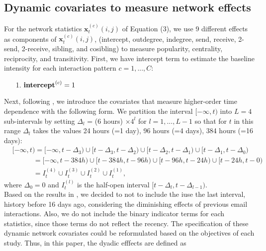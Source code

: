 \documentclass[a4paper]{article}
\begin{document}
 \subsection{Dynamic covariates to measure network effects} \label{subsec: Dynamic covariates2}
 For the network statistics $\boldsymbol{x}^{(c)}_t(i, j)$ of Equation (3), we use 9 different effects as components of $\boldsymbol{x}^{(c)}_t(i, j)$, (intercept, outdegree, indegree, send, receive, 2-send, 2-receive, sibling, and cosibling) to measure popularity, centrality, reciprocity, and transitivity. First, we have intercept term to estimate the baseline intensity for each interaction pattern $c=1,...,C$:
 \begin{itemize}
	\item [1.] $\mbox{\textbf{intercept}}^{(c)}= 1$
 \end{itemize}
Next, following \cite{PerryWolfe2012}, we introduce the covariates that measure higher-order time dependence with the following
form. We partition the interval $[-\infty, t)$ into $L=4$ sub-intervals by setting $\Delta_l$ = (6 hours) $\times  4^l$ for $l=1,...,L-1$ so that for $t$ in this range $\Delta_l$ takes the values 24 hours (=1 day), 96 hours (=4 days), 384 hours (=16 days): 
\begin{equation*}
\begin{aligned}
&[-\infty,t) =[-\infty,t-\Delta_3)\cup [t-\Delta_3, t-\Delta_{2}) \cup [t-\Delta_{2}, t-\Delta_{1})\cup [t-\Delta_1, t-\Delta_{0})\\& \quad\quad\quad= [-\infty,t-384h)\cup [t-384h, t-96h) \cup [t-96h, t-24h)\cup [t-24h, t-0)
\\& \quad\quad\quad=I_t^{(4)}\cup  I_t^{(3)}\cup  I_t^{(2)}\cup I_t^{(1)},
\end{aligned}
\end{equation*}
where $\Delta_0 = 0$ and $I_{t}^{(l)} $ is the half-open interval $[t-\Delta_l, t-\Delta_{l-1})$. \\ \newline Based on the results in \cite{PerryWolfe2012}, we decided to not to include the iuse the last interval, history before 16 days ago, considering the diminishing effects of previous email interactions. Also, we do not include the binary indicator terms for each statistics, since those terms do not reflect the recency. The specification of these dynamic network covariates could be reformulated based on the objectives of each study. Thus, in this paper, the dyadic efffects are defined as
\end{document}
